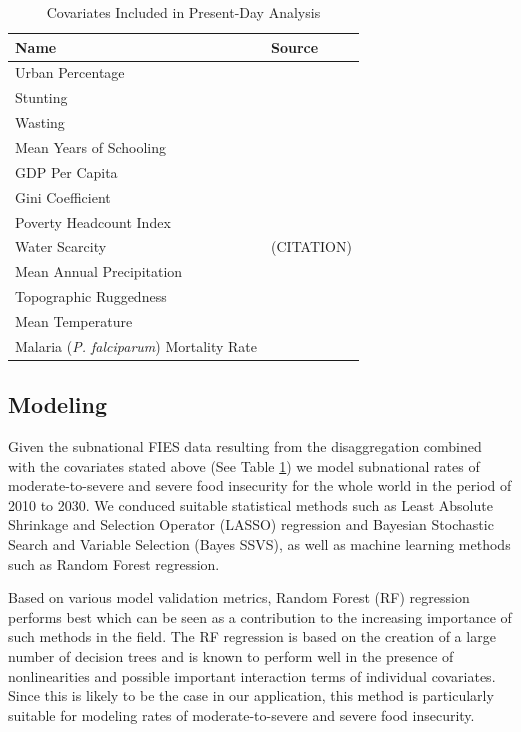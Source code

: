 \documentclass{article}
\begin{document}
\begin{table}[H]
	\begin{tabular}{ll}
		\toprule
		Name & Source \\
		\midrule
		Urban Percentage & \citep{Jones2016} \\
		Stunting & \citep{Local2020} \\
		Wasting & \citep{Local2020} \\
		Mean Years of Schooling & \citep{Smits2019, KC2017} \\
		GDP Per Capita & \citep{Smits2019, Dellink2017} \\
		Gini Coefficient & \citep{Rao2019a} \\
    Poverty Headcount Index & \citep{Cuaresma2018} \\
		Water Scarcity & (CITATION) \\
		Mean Annual Precipitation &  \cite{abatzoglou2018terraclimate, warszawski2014inter} \\
		Topographic Ruggedness &  \cite{USGS1996, Riley1999} \\
		Mean Temperature &  \cite{abatzoglou2018terraclimate, warszawski2014inter} \\
		Malaria (\textit{P. falciparum}) Mortality Rate &  \cite{Weiss2019} \\
		\bottomrule
	\end{tabular}
	\caption{Covariates Included in Present-Day Analysis}
	\label{tab:covars}
\end{table}


\subsection{Modeling}

Given the subnational FIES data resulting from the disaggregation combined with the covariates stated above (See Table \ref{tab:covars}) we model subnational rates of moderate-to-severe and severe food insecurity for the whole world in the period of 2010 to 2030. We conduced suitable statistical methods such as Least Absolute Shrinkage and Selection Operator (LASSO) regression and Bayesian Stochastic Search and Variable Selection (Bayes SSVS), as well as machine learning methods such as Random Forest regression. 

Based on various model validation metrics, Random Forest (RF) regression performs best which can be seen as a contribution to the increasing importance of such methods in the field. The RF regression is based on the creation of a large number of decision trees and is known to perform well in the presence of nonlinearities and possible important interaction terms of individual covariates. Since this is likely to be the case in our application, this method is particularly suitable for modeling rates of moderate-to-severe and severe food insecurity. 
\end{document}
